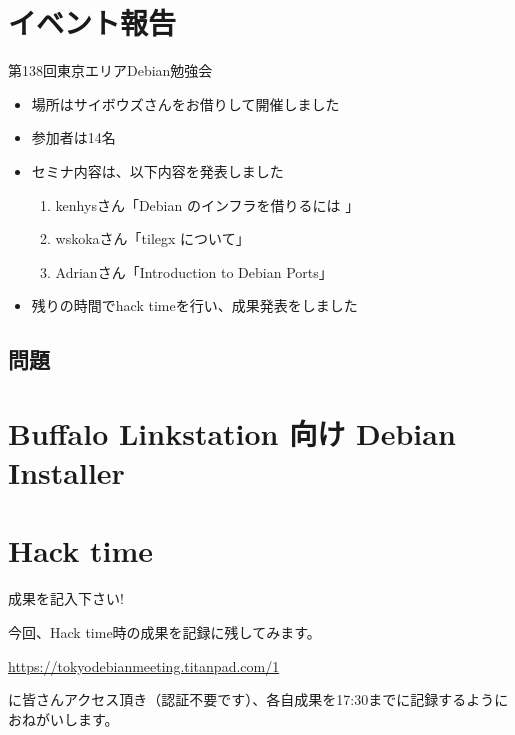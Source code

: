 \section{イベント報告}

\begin{frame}{第138回東京エリアDebian勉強会 }

\begin{itemize}
\item 場所はサイボウズさんをお借りして開催しました
\item 参加者は14名
\item セミナ内容は、以下内容を発表しました
  \begin{enumerate}
  \item kenhysさん「Debian のインフラを借りるには 」
  \item wskokaさん「tilegx について」
  \item Adrianさん「Introduction to Debian Ports」
  \end{enumerate}
\item 残りの時間でhack timeを行い、成果発表をしました
\end{itemize} 
\end{frame}

\subsection{問題}



\section{Buffalo Linkstation 向け Debian Installer}

\section{Hack time}

\begin{frame}{成果を記入下さい!}

  今回、Hack time時の成果を記録に残してみます。

\url{https://tokyodebianmeeting.titanpad.com/1}

に皆さんアクセス頂き（認証不要です）、各自成果を17:30までに記録するようにおねがいします。

\end{frame}
  
